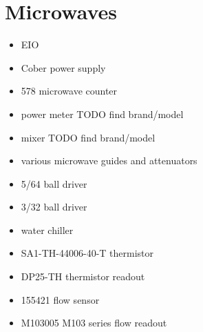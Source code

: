 \section{Microwaves}
\begin{itemize}
 \item EIO
\item Cober power supply
\item {} 578 microwave counter
\item power meter TODO find brand/model
\item mixer TODO find brand/model
\item various microwave guides and attenuators
\item 5/64\inches{} ball driver
\item 3/32\inches{} ball driver
\item water chiller
\item {} SA1-TH-44006-40-T thermistor
\item {} DP25-TH thermistor readout
\item {} 155421 flow sensor
\item {} M103005  M103 series flow readout
\end{itemize}
